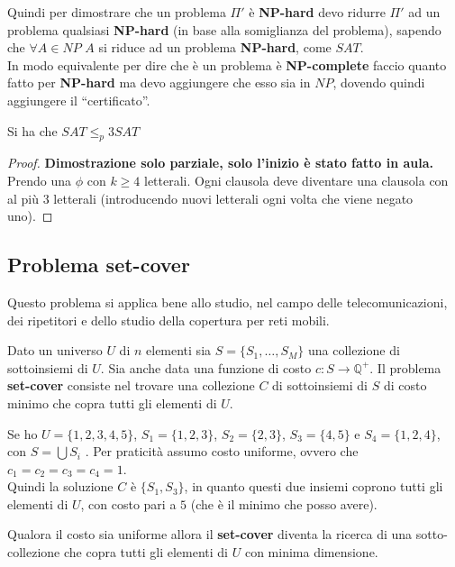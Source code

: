 								Quindi per dimostrare che un problema $\Pi'$ è \textbf{NP-hard} devo ridurre
								$\Pi'$ ad un problema qualsiasi \textbf{NP-hard} (in base alla somiglianza del
								problema), sapendo che $\forall A\in NP$ $A$ si riduce ad un problema
								\textbf{NP-hard}, come $SAT$.\\
								In modo equivalente per dire che è un problema è \textbf{NP-complete} faccio
								quanto fatto per \textbf{NP-hard} ma devo aggiungere che esso sia in $NP$,
								dovendo quindi aggiungere il ``certificato''.
								\begin{definizione}
									Si ha che $SAT\leq_p 3SAT$
								\end{definizione}
								\begin{proof}
									\textbf{Dimostrazione solo parziale, solo l'inizio è stato fatto in aula.\\}
										Prendo una $\phi$ con $k\geq 4$ letterali. Ogni clausola deve diventare una
										clausola con al più 3 letterali (introducendo nuovi letterali ogni volta che
										viene negato uno). 
										\end{proof}
										\subsection{Problema set-cover}
										Questo problema si applica bene allo studio, nel campo delle telecomunicazioni,
										dei ripetitori e dello studio della copertura per reti mobili.
										\begin{definizione}
											Dato un universo $U$ di $n$ elementi sia $S=\{S_1,\ldots,S_M\}$ una collezione
											di sottoinsiemi di $U$. Sia anche data una funzione di costo
											$c:S\to\mathbb{Q}^+$. Il problema \textbf{set-cover} consiste nel trovare una
											collezione $C$ di sottoinsiemi di $S$ di costo minimo che copra tutti gli
											elementi di $U$.
										\end{definizione}
										\begin{esempio}
											Se ho $U=\{1,2,3,4,5\}$, $S_1=\{1,2,3\}$, $S_2=\{2,3\}$, $S_3=\{4,5\}$ e
											$S_4=\{1,2,4\}$, con $S=\bigcup S_i$ . Per praticità assumo costo
											uniforme, ovvero che  $c_1=c_2=c_3=c_4=1$.\\
											Quindi la soluzione $C$ è $\{S_1,S_3\}$, in quanto questi due insiemi coprono
											tutti gli elementi di $U$, con costo pari a $5$ (che è il minimo che posso
											avere).
										\end{esempio}
										\begin{definizione}
											Qualora il costo sia uniforme allora il \textbf{set-cover} diventa la ricerca
											di una sotto-collezione che copra tutti gli elementi di $U$ con minima
											dimensione.
										\end{definizione}
																				
